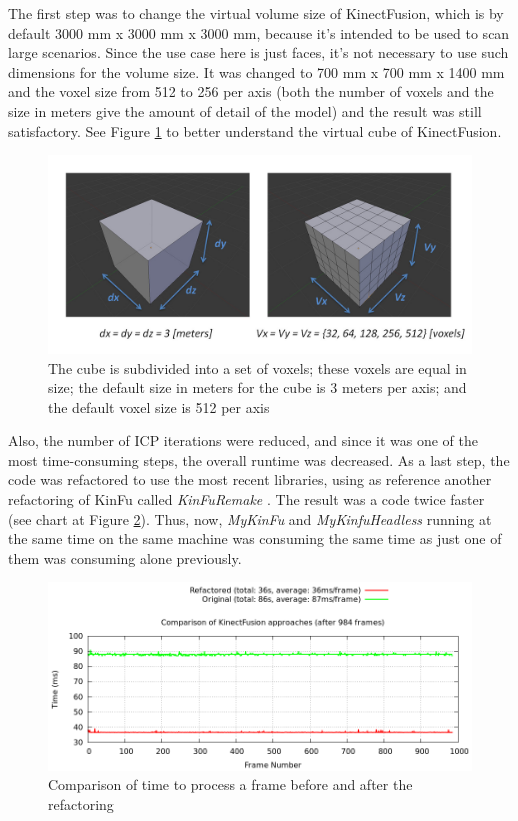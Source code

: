 \documentclass[msc, a4paper, classic, en]{ufbathesis}
\begin{document}
The first step was to change the virtual volume size of KinectFusion, which is by default 3000 mm x 3000 mm x 3000 mm, because it's intended to be used to scan large scenarios. Since the use case here is just faces, it's not necessary to use such dimensions for the volume size. It was changed to 700 mm x 700 mm x 1400 mm and the voxel size from 512 to 256 per axis (both the number of voxels and the size in meters give the amount of detail of the model) and the result was still satisfactory. See Figure \ref{fig:kinfu} to better understand the virtual cube of KinectFusion.

\begin{figure}
\centering
\includegraphics[width=1\textwidth]{images/kinfu.jpg}
\caption{The cube is subdivided into a set of voxels; these voxels are equal in size; the default size in meters for the cube is 3 meters per axis; and the default voxel size is 512 per axis \cite{pclkinfu}}
\label{fig:kinfu}
\end{figure}

Also, the number of ICP iterations were reduced, and since it was one of the most time-consuming steps, the overall runtime was decreased. As a last step, the code was refactored to use the most recent libraries, using as reference another refactoring of KinFu called \textit{KinFuRemake} \cite{kinfuremake}. The result was a code twice faster (see chart at Figure \ref{fig:kinfuchart}). Thus, now, \textit{MyKinFu} and \textit{MyKinfuHeadless} running at the same time on the same machine was consuming the same time as just one of them was consuming alone previously.

\begin{figure}
\centering
\includegraphics[width=1\textwidth]{images/plot.png}
\caption{Comparison of time to process a frame before and after the refactoring}
\label{fig:kinfuchart}
\end{figure}
\end{document}
